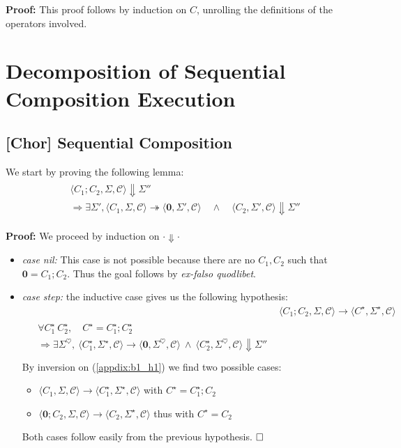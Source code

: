 \documentclass[12pt,a4paper,twoside]{book}
\newcommand{\qed}{\hfill\square}
\newcommand{\heart}{\heartsuit}
\begin{document}
\begin{appendices}
\noindent\textbf{Proof:}
This proof follows by induction on $C$, unrolling the definitions of the operators involved.


\chapter{Decomposition of Sequential Composition Execution}
\label{appdix:B}
\section{\textbf{[Chor]} Sequential Composition}
We start by proving the following lemma:
\begin{align}
\begin{split}
\label{appdix:Bskin}
&\langle C_1 ; C_2, \Sigma, \mathscr{C}\rangle \Downarrow \Sigma''\\
&\Rightarrow \exists \Sigma',
\langle C_1, \Sigma, \mathscr{C} \rangle \twoheadrightarrow \langle \boldsymbol{0}, \Sigma', \mathscr{C} \rangle 
\quad\land\quad
\langle C_2, \Sigma', \mathscr{C} \rangle \Downarrow \Sigma''
\end{split}
\end{align}

\noindent\textbf{Proof:}
We proceed by induction on $\cdot \Downarrow \cdot$
\begin{itemize}
\item \emph{case nil:} This case is not possible because there are no $C_1, C_2$ such that $\boldsymbol{0} = C_1; C_2$. Thus the goal follows by \emph{ex-falso quodlibet}.
\item \emph{case step:} the inductive case gives us the following hypothesis:
\begin{align}
&\langle C_1; C_2, \Sigma, \mathscr{C}\rangle \rightarrow
\langle C^\star, \Sigma^\star, \mathscr{C}\rangle \label{appdix:b1_h1} \tag{H1}\\
\begin{split}
&\forall C_1^\star~C_2^\star,\quad C^\star = C_1^\star; C_2^\star \\
&\Rightarrow \exists \Sigma^\heart,~\langle C_1^\star, \Sigma^\star, \mathscr{C}\rangle \rightarrow \langle \boldsymbol{0}, \Sigma^\heart, \mathscr{C}\rangle ~\land~ \langle C_2^\star, \Sigma^\heart, \mathscr{C}\rangle \Downarrow \Sigma'' \\
\end{split}\label{appdix:b1_ih}\tag{IH}
\end{align}
By inversion on (\ref{appdix:b1_h1}) we find two possible cases:
\begin{itemize}
\item $\langle C_1, \Sigma, \mathscr{C}\rangle \rightarrow
\langle C_1^\star, \Sigma^\star, \mathscr{C}\rangle$ with $C^\star = C_1^\star; C_2$
\item $\langle \boldsymbol{0}; C_2, \Sigma, \mathscr{C}\rangle \rightarrow
\langle C_2, \Sigma^\star, \mathscr{C}\rangle$ thus with $C^\star = C_2$
\end{itemize}
Both cases follow easily from the previous hypothesis. $\qed$
\end{itemize}



\end{appendices}
\end{document}
